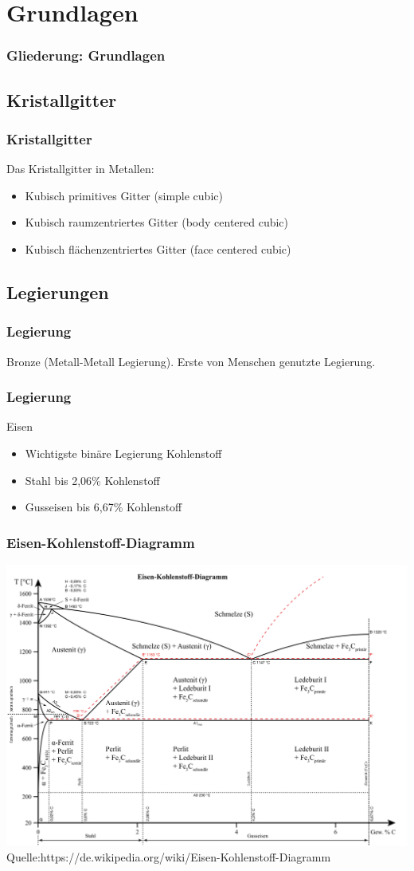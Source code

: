 \section{Grundlagen}

\begin{frame}[t]\frametitle{Gliederung: Grundlagen}
\tableofcontents[
currentsection,
subsectionstyle=show/show/hide
]
\end{frame}

\subsection{Kristallgitter}
\label{grnd:gitter}
\begin{frame}[c]\frametitle{Kristallgitter}
	Das Kristallgitter in Metallen:
	\begin{itemize}
		\item{Kubisch primitives Gitter (simple cubic)}
		\item{Kubisch raumzentriertes Gitter (body centered cubic)}
		\item{Kubisch flächenzentriertes Gitter (face centered cubic)}
	\end{itemize}
\end{frame}

\subsection{Legierungen}
\label{grnd:legierungen}
\begin{frame}[t]\frametitle{Legierung}
	Bronze (Metall-Metall Legierung).
	Erste von Menschen genutzte Legierung.
\end{frame}

\begin{frame}[t]\frametitle{Legierung}
	Eisen
	\begin{itemize}
		\item{Wichtigste binäre Legierung Kohlenstoff}
		\item{Stahl bis 2,06\% Kohlenstoff}
		\item{Gusseisen bis 6,67\% Kohlenstoff}
	\end{itemize}
\end{frame}

\begin{frame}[t]\frametitle{Eisen-Kohlenstoff-Diagramm}
	\centering
	\includegraphics[height=0.5\textwidth]{medien/ekd.png}
	\\
	\tiny{Quelle:https://de.wikipedia.org/wiki/Eisen-Kohlenstoff-Diagramm}
\end{frame}

